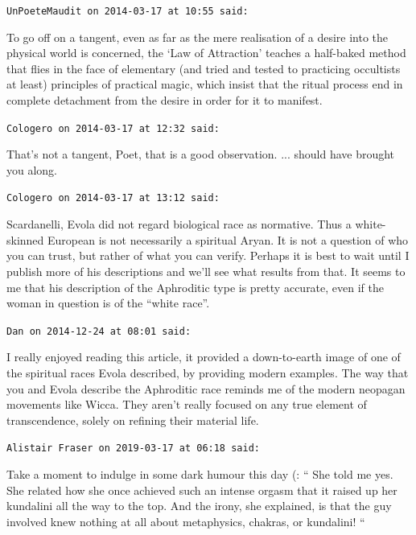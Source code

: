 \begin{footnotesize}
\begin{sffamily}
\texttt{UnPoeteMaudit on 2014-03-17 at 10:55 said:}

To go off on a tangent, even as far as the mere realisation of a desire into the physical world is concerned, the `Law of Attraction' teaches a half-baked method that flies in the face of elementary (and tried and tested to practicing occultists at least) principles of practical magic, which insist that the ritual process end in complete detachment from the desire in order for it to manifest.

\hfill

\texttt{Cologero on 2014-03-17 at 12:32 said:}

That's not a tangent, Poet, that is a good observation. ... should have brought you along.

\hfill

\texttt{Cologero on 2014-03-17 at 13:12 said:}

Scardanelli, Evola did not regard biological race as normative. Thus a white-skinned European is not necessarily a spiritual Aryan. It is not a question of who you can trust, but rather of what you can verify. Perhaps it is best to wait until I publish more of his descriptions and we'll see what results from that. It seems to me that his description of the Aphroditic type is pretty accurate, even if the woman in question is of the ``white race''.

\hfill

\texttt{Dan on 2014-12-24 at 08:01 said:}

I really enjoyed reading this article, it provided a down-to-earth image of one of the spiritual races Evola described, by providing modern examples. The way that you and Evola describe the Aphroditic race reminds me of the modern neopagan movements like Wicca. They aren't really focused on any true element of transcendence, solely on refining their material life.

\hfill

\texttt{Alistair Fraser on 2019-03-17 at 06:18 said:}

Take a moment to indulge in some dark humour this day (: `` She told me yes. She related how she once achieved such an intense orgasm that it raised up her kundalini all the way to the top. And the irony, she explained, is that the guy involved knew nothing at all about metaphysics, chakras, or kundalini! ``

\end{sffamily}
\end{footnotesize}

